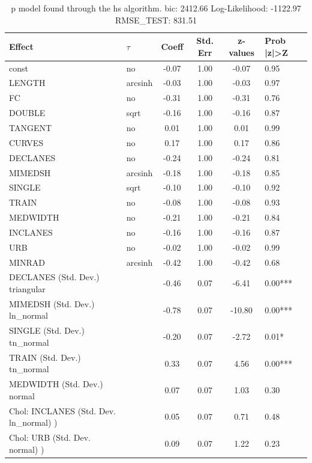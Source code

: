\begin{table}
	\caption{p model found through the hs algorithm. bic: 2412.66 Log-Likelihood: -1122.97 RMSE_TEST: 831.51}
	\begin{center}
		\begin{tabular}{|l|l|c|c|c|l|}
			\hline
			Effect & $\tau$ & Coeff & Std. Err & z-values & Prob |z|>Z \\
			\hline
			const & no & -0.07 & 1.00 & -0.07 & 0.95 \\
			\hline
			LENGTH & arcsinh & -0.03 & 1.00 & -0.03 & 0.97 \\
			\hline
			FC & no & -0.31 & 1.00 & -0.31 & 0.76 \\
			\hline
			DOUBLE & sqrt & -0.16 & 1.00 & -0.16 & 0.87 \\
			\hline
			TANGENT & no & 0.01 & 1.00 & 0.01 & 0.99 \\
			\hline
			CURVES & no & 0.17 & 1.00 & 0.17 & 0.86 \\
			\hline
			DECLANES & no & -0.24 & 1.00 & -0.24 & 0.81 \\
			\hline
			MIMEDSH & arcsinh & -0.18 & 1.00 & -0.18 & 0.85 \\
			\hline
			SINGLE & sqrt & -0.10 & 1.00 & -0.10 & 0.92 \\
			\hline
			TRAIN & no & -0.08 & 1.00 & -0.08 & 0.93 \\
			\hline
			MEDWIDTH & no & -0.21 & 1.00 & -0.21 & 0.84 \\
			\hline
			INCLANES & no & -0.16 & 1.00 & -0.16 & 0.87 \\
			\hline
			URB & no & -0.02 & 1.00 & -0.02 & 0.99 \\
			\hline
			MINRAD & arcsinh & -0.42 & 1.00 & -0.42 & 0.68 \\
			\hline
			DECLANES (Std. Dev.) triangular &  & -0.46 & 0.07 & -6.41 & 0.00*** \\
			\hline
			MIMEDSH (Std. Dev.) ln_normal &  & -0.78 & 0.07 & -10.80 & 0.00*** \\
			\hline
			SINGLE (Std. Dev.) tn_normal &  & -0.20 & 0.07 & -2.72 & 0.01* \\
			\hline
			TRAIN (Std. Dev.) tn_normal &  & 0.33 & 0.07 & 4.56 & 0.00*** \\
			\hline
			MEDWIDTH (Std. Dev.) normal &  & 0.07 & 0.07 & 1.03 & 0.30 \\
			\hline
			 Chol: INCLANES (Std. Dev. ln_normal) ) &  & 0.05 & 0.07 & 0.71 & 0.48 \\
			\hline
			 Chol: URB (Std. Dev. normal) ) &  & 0.09 & 0.07 & 1.22 & 0.23 \\

\end{tabular}
\end{center}
\end{table}
